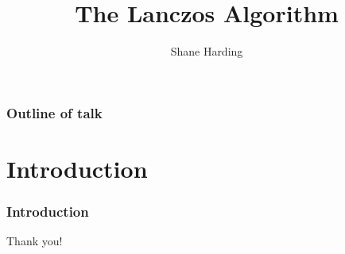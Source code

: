 \documentclass[pdf]{beamer}
\title{The Lanczos Algorithm}
\author{Shane Harding}
\begin{document}
\begin{frame}
\titlepage
\end{frame}


\begin{frame}
\frametitle{Outline of talk}
\tableofcontents[]

\end{frame}


\section{Introduction}

\begin{frame}
\tableofcontents[currentsection]
\end{frame}


\begin{frame}
\frametitle{Introduction}
\centering


\end{frame}



\begin{frame}
\centering
Thank you!
\end{frame}
\end{document}
